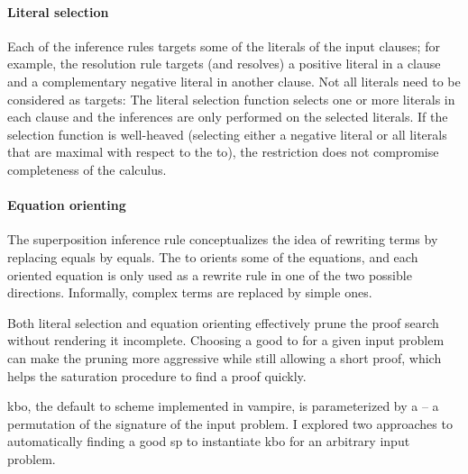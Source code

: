 \paragraph{Literal selection}
Each of the inference rules targets some of the literals of the input clauses;
for example, the resolution rule targets (and resolves) a positive literal in a clause and a complementary negative literal in another clause.
Not all literals need to be considered as targets:
The literal selection function selects one or more literals in each clause
and the inferences are only performed on the selected literals.
If the selection function is well-heaved
(selecting either a negative literal
or all literals that are maximal with respect to the \gls{to}),
the restriction does not compromise completeness of the calculus.

\paragraph{Equation orienting}
The superposition inference rule conceptualizes the idea of rewriting terms by replacing equals by equals.
The \gls{to} orients some of the equations, and each oriented equation is only used as a rewrite rule in one of the two possible directions.
Informally, complex terms are replaced by simple ones.

Both literal selection and equation orienting effectively prune the proof search without rendering it incomplete.
Choosing a good \gls{to} for a given input problem
can make the pruning more aggressive while still allowing a short proof,
which helps the saturation procedure to find a proof quickly.

\Gls{kbo}, the default \gls{to} scheme implemented in \gls{vampire}, is parameterized by a  -- a permutation of the \gls{signature} of the input problem.
I explored two approaches to automatically finding a good \gls{sp} to instantiate \gls{kbo} for an arbitrary input problem.

